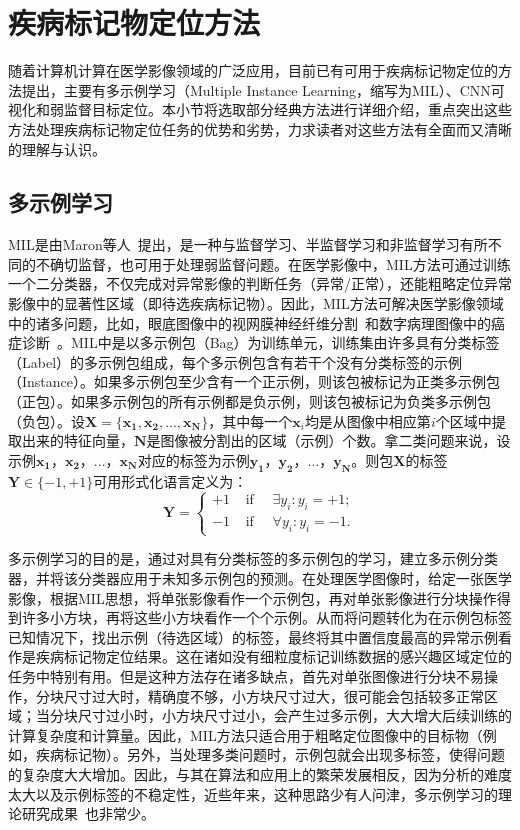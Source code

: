 \section{疾病标记物定位方法}
随着计算机计算在医学影像领域的广泛应用，目前已有可用于疾病标记物定位的方法提出，主要有多示例学习（Multiple Instance Learning，缩写为MIL）、CNN可视化和弱监督目标定位。本小节将选取部分经典方法进行详细介绍，重点突出这些方法处理疾病标记物定位任务的优势和劣势，力求读者对这些方法有全面而又清晰的理解与认识。
\subsection{多示例学习}
MIL是由Maron等人~\cite{maron1998framework}提出，是一种与监督学习、半监督学习和非监督学习有所不同的不确切监督，也可用于处理弱监督问题。在医学影像中，MIL方法可通过训练一个二分类器，不仅完成对异常影像的判断任务（异常/正常），还能粗略定位异常影像中的显著性区域（即待选疾病标记物）。因此，MIL方法可解决医学影像领域中的诸多问题，比如，眼底图像中的视网膜神经纤维分割~\cite{manivannan2017subcategory}和数字病理图像中的癌症诊断~\cite{kandemir2014empowering}。MIL中是以多示例包（Bag）为训练单元，训练集由许多具有分类标签（Label）的多示例包组成，每个多示例包含有若干个没有分类标签的示例（Instance）。如果多示例包至少含有一个正示例，则该包被标记为正类多示例包（正包）。如果多示例包的所有示例都是负示例，则该包被标记为负类多示例包（负包）。设$\boldsymbol{X}=\{\boldsymbol{x_1,x_2,...,x_N}\}$，其中每一个$\boldsymbol{x}_i$均是从图像中相应第$i$个区域中提取出来的特征向量，$\boldsymbol{N}$是图像被分割出的区域（示例）个数。拿二类问题来说，设示例$\boldsymbol{x_1}$，$\boldsymbol{x_2}$，...，$\boldsymbol{x_N}$对应的标签为示例$\boldsymbol{y_1}$，$\boldsymbol{y_2}$，...，$\boldsymbol{y_N}$。则包$\boldsymbol{X}$的标签$\boldsymbol{Y}\in \{-1,+1\}$可用形式化语言定义为：
\begin{equation}
\boldsymbol{Y}=\left\{\begin{array}{ll}
{+1} & {\text { if } \quad \exists y_{i}: y_{i}=+1;} \\
{-1} & {\text { if } \quad \forall y_{i}: y_{i}=-1.}
\end{array}\right.
\end{equation}

\noindent 多示例学习的目的是，通过对具有分类标签的多示例包的学习，建立多示例分类器，并将该分类器应用于未知多示例包的预测。在处理医学图像时，给定一张医学影像，根据MIL思想，将单张影像看作一个示例包，再对单张影像进行分块操作得到许多小方块，再将这些小方块看作一个个示例。从而将问题转化为在示例包标签已知情况下，找出示例（待选区域）的标签，最终将其中置信度最高的异常示例看作是疾病标记物定位结果。这在诸如没有细粒度标记训练数据的感兴趣区域定位的任务中特别有用。但是这种方法存在诸多缺点，首先对单张图像进行分块不易操作，分块尺寸过大时，精确度不够，小方块尺寸过大，很可能会包括较多正常区域；当分块尺寸过小时，小方块尺寸过小，会产生过多示例，大大增大后续训练的计算复杂度和计算量。因此，MIL方法只适合用于粗略定位图像中的目标物（例如，疾病标记物）。另外，当处理多类问题时，示例包就会出现多标签，使得问题的复杂度大大增加。因此，与其在算法和应用上的繁荣发展相反，因为分析的难度太大以及示例标签的不稳定性，近些年来，这种思路少有人问津，多示例学习的理论研究成果~\cite{gondra2014object, wu2015deep,Maron1998MultipleInstanceLF}也非常少。

